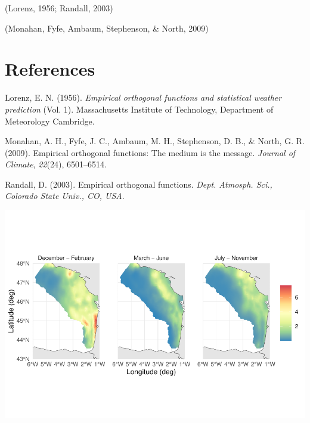 \documentclass[
  man]{apa6}
\newlength{\cslhangindent}
\newlength{\cslentryspacingunit} %
\newenvironment{CSLReferences}[2] %
 {%
  \setlength{\parindent}{0pt}
  \ifodd #1
  \let\oldpar\par
  \def\par{\hangindent=\cslhangindent\oldpar}
  \fi
  \setlength{\parskip}{#2\cslentryspacingunit}
 }%
 {}
\begin{document}
(Lorenz, 1956; Randall, 2003)

(Monahan, Fyfe, Ambaum, Stephenson, \& North, 2009)

\newpage

\hypertarget{references}{%
\section{References}\label{references}}

\begingroup
\setlength{\parindent}{-0.5in}
\setlength{\leftskip}{0.5in}

\hypertarget{refs}{}
\begin{CSLReferences}{1}{0}
\leavevmode{}%
Lorenz, E. N. (1956). \emph{Empirical orthogonal functions and statistical weather prediction} (Vol. 1). Massachusetts Institute of Technology, Department of Meteorology Cambridge.

\leavevmode{}%
Monahan, A. H., Fyfe, J. C., Ambaum, M. H., Stephenson, D. B., \& North, G. R. (2009). Empirical orthogonal functions: The medium is the message. \emph{Journal of Climate}, \emph{22}(24), 6501--6514.

\leavevmode{}%
Randall, D. (2003). Empirical orthogonal functions. \emph{Dept. Atmosph. Sci., Colorado State Univ., CO, USA}.

\end{CSLReferences}

\endgroup

\includegraphics{paper_4_files/figure-latex/SM plot-1.pdf}
\end{document}
